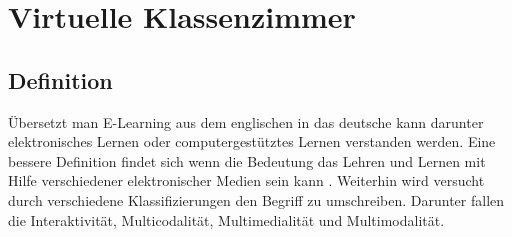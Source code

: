 \chapter{Virtuelle Klassenzimmer}

\section{Definition}
Übersetzt man E-Learning aus dem englischen in das deutsche kann darunter  \glqq elektronisches Lernen\grqq{} oder \glqq computergestütztes Lernen\grqq{} verstanden werden. Eine bessere Definition findet sich wenn die Bedeutung \glqq das Lehren und Lernen mit Hilfe verschiedener elektronischer Medien\grqq{} sein kann \cite[vgl.][]{elearning}. \newline
\newline Weiterhin wird versucht durch verschiedene Klassifizierungen den Begriff zu umschreiben. Darunter fallen die Interaktivität, Multicodalität, Multimedialität und Multimodalität.


